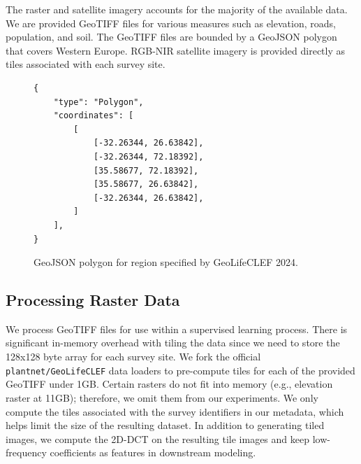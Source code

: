 The raster and satellite imagery accounts for the majority of the available data. 
We are provided GeoTIFF files for various measures such as elevation, roads, population, and soil. 
The GeoTIFF files are bounded by a GeoJSON polygon that covers Western Europe. 
RGB-NIR satellite imagery is provided directly as tiles associated with each survey site.

\begin{figure}
\begin{lstlisting}[frame=single]
  {
    "type": "Polygon",
    "coordinates": [
        [
            [-32.26344, 26.63842],
            [-32.26344, 72.18392],
            [35.58677, 72.18392],
            [35.58677, 26.63842],
            [-32.26344, 26.63842],
        ]
    ],
}
\end{lstlisting}
\caption{GeoJSON polygon for region specified by GeoLifeCLEF 2024.}
\label{lst:polygon}
\end{figure}

\subsection{Processing Raster Data}

We process GeoTIFF files for use within a supervised learning process. 
There is significant in-memory overhead with tiling the data since we need to store the 128x128 byte array for each survey site. 
We fork the official \texttt{plantnet/GeoLifeCLEF} data loaders to pre-compute tiles for each of the provided GeoTIFF under 1GB. 
Certain rasters do not fit into memory (e.g., elevation raster at 11GB); therefore, we omit them from our experiments. 
We only compute the tiles associated with the survey identifiers in our metadata, which helps limit the size of the resulting dataset. 
In addition to generating tiled images, we compute the 2D-DCT on the resulting tile images and keep low-frequency coefficients as features in downstream modeling. 


